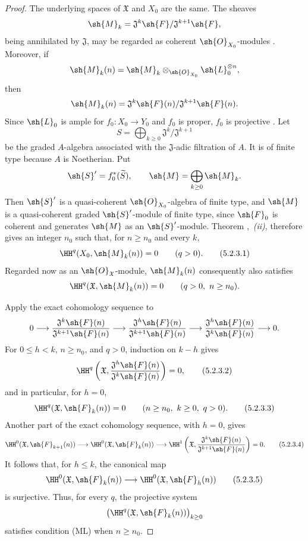 \begin{proof}
The underlying spaces of $\mathfrak{X}$ and $X_0$ are the same.
The sheaves
\[
  \sh{M}_k
  =
  \mathfrak{J}^k\sh{F}/\mathfrak{J}^{k+1}\sh{F},
\]
being annihilated by $\mathfrak{J}$, may be regarded as coherent
$\sh{O}_{X_0}$-modules .  Moreover, if
\[
  \sh{M}_k(n)
  =
  \sh{M}_k\otimes_{\sh{O}_{X_0}}\sh{L}_0^{\otimes n},
\]
then
\[
  \sh{M}_k(n)
  =
  \mathfrak{J}^k\sh{F}(n)/
  \mathfrak{J}^{k+1}\sh{F}(n).
\]
Since $\sh{L}_0$ is ample for $f_0:X_0\to Y_0$ and $f_0$ is
proper,
$f_0$ is projective .  Let
\[
  S=\bigoplus_{k\geq0}
  \mathfrak{J}^k/\mathfrak{J}^{k+1}
\]
be the graded $A$-algebra associated with the
$\mathfrak{J}$-adic filtration of $A$.  It is of finite type
because $A$ is Noetherian.  Put
\[
  \sh{S}'=f_0^*(\widetilde{S}),\qquad
  \sh{M}=\bigoplus_{k\geq0}\sh{M}_k.
\]
Then $\sh{S}'$ is a quasi-coherent $\sh{O}_{X_0}$-algebra of
finite type, and $\sh{M}$ is a quasi-coherent graded
$\sh{S}'$-module of finite type, since $\sh{F}_0$ is coherent and
generates $\sh{M}$ as an $\sh{S}'$-module.  Theorem
,~\emph{(ii)}, therefore gives an integer $n_0$
such that, for $n\geq n_0$ and every $k$,
\[
  \HH^q(X_0,\sh{M}_k(n))=0
  \qquad(q>0).
  \tag{5.2.3.1}
  \label{III.5.2.3.1}
\]
Regarded now as an $\sh{O}_{\mathfrak{X}}$-module,
$\sh{M}_k(n)$ consequently also satisfies
\[
  \HH^q(\mathfrak{X},\sh{M}_k(n))=0
  \qquad(q>0,\ n\geq n_0).
\]

Apply the exact cohomology sequence to
\[
  0\longrightarrow
  \frac{\mathfrak{J}^k\sh{F}(n)}
       {\mathfrak{J}^{k+1}\sh{F}(n)}
  \longrightarrow
  \frac{\mathfrak{J}^h\sh{F}(n)}
       {\mathfrak{J}^{k+1}\sh{F}(n)}
  \longrightarrow
  \frac{\mathfrak{J}^h\sh{F}(n)}
       {\mathfrak{J}^{k}\sh{F}(n)}
  \longrightarrow0.
\]
For $0\leq h<k$, $n\geq n_0$, and $q>0$, induction on $k-h$
gives
\[
  \HH^q\left(
    \mathfrak{X},
    \frac{\mathfrak{J}^h\sh{F}(n)}
         {\mathfrak{J}^{k}\sh{F}(n)}
  \right)=0,
  \tag{5.2.3.2}
  \label{III.5.2.3.2}
\]
and in particular, for $h=0$,
\[
  \HH^q(\mathfrak{X},\sh{F}_k(n))=0
  \qquad(n\geq n_0,\ k\geq0,\ q>0).
  \tag{5.2.3.3}
  \label{III.5.2.3.3}
\]
Another part of the exact cohomology sequence, with $h=0$, gives
\[
  \HH^0(\mathfrak{X},\sh{F}_{k+1}(n))
  \longrightarrow
  \HH^0(\mathfrak{X},\sh{F}_k(n))
  \longrightarrow
  \HH^1\left(
    \mathfrak{X},
    \frac{\mathfrak{J}^k\sh{F}(n)}
         {\mathfrak{J}^{k+1}\sh{F}(n)}
  \right)
  =0.
  \tag{5.2.3.4}
  \label{III.5.2.3.4}
\]
It follows that, for $h\leq k$, the canonical map
\[
  \HH^0(\mathfrak{X},\sh{F}_k(n))
  \longrightarrow
  \HH^0(\mathfrak{X},\sh{F}_h(n))
  \tag{5.2.3.5}
  \label{III.5.2.3.5}
\]
is surjective.  Thus, for every $q$, the projective system
\[
  \bigl(\HH^q(\mathfrak{X},\sh{F}_k(n))\bigr)_{k\geq0}
\]
satisfies condition (ML) when $n\geq n_0$.


\end{proof}
